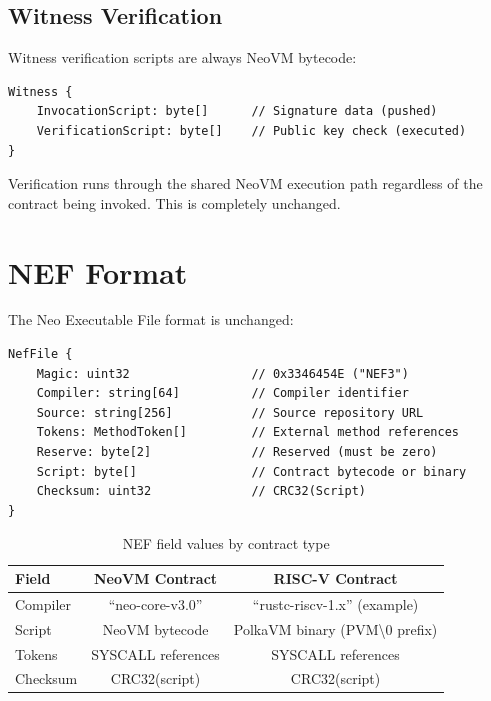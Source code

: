 \documentclass[11pt,a4paper]{article}
\begin{document}
\subsection{Witness Verification}

Witness verification scripts are always NeoVM bytecode:

\begin{lstlisting}[caption={Witness structure (unchanged)}]
Witness {
    InvocationScript: byte[]      // Signature data (pushed)
    VerificationScript: byte[]    // Public key check (executed)
}
\end{lstlisting}

Verification runs through the shared NeoVM execution path regardless of the contract
being invoked. This is completely unchanged.

\section{NEF Format}
\label{sec:nef}

The Neo Executable File format is unchanged:

\begin{lstlisting}[caption={NEF file structure}]
NefFile {
    Magic: uint32                 // 0x3346454E ("NEF3")
    Compiler: string[64]          // Compiler identifier
    Source: string[256]           // Source repository URL
    Tokens: MethodToken[]         // External method references
    Reserve: byte[2]              // Reserved (must be zero)
    Script: byte[]                // Contract bytecode or binary
    Checksum: uint32              // CRC32(Script)
}
\end{lstlisting}

\begin{table}[H]
\centering
\begin{tabular}{lcc}
\toprule
\textbf{Field} & \textbf{NeoVM Contract} & \textbf{RISC-V Contract} \\
\midrule
Compiler & ``neo-core-v3.0'' & ``rustc-riscv-1.x'' (example) \\
Script & NeoVM bytecode & PolkaVM binary (PVM\textbackslash0 prefix) \\
Tokens & SYSCALL references & SYSCALL references \\
Checksum & CRC32(script) & CRC32(script) \\
\bottomrule
\end{tabular}
\caption{NEF field values by contract type}
\end{table}
\end{document}
